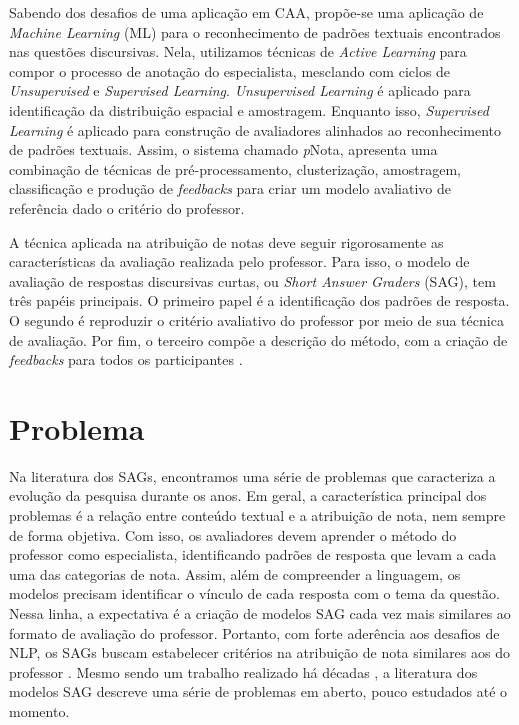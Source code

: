 Sabendo dos desafios de uma aplicação em CAA, propõe-se uma aplicação de \textit{Machine Learning} (ML) para o reconhecimento de padrões textuais encontrados nas questões discursivas. Nela, utilizamos técnicas de \textit{Active Learning} para compor o processo de anotação do especialista, mesclando com ciclos de \textit{Unsupervised} e \textit{Supervised Learning}. \textit{Unsupervised Learning} é aplicado para identificação da distribuição espacial e amostragem. Enquanto isso, \textit{Supervised Learning} é aplicado para construção de avaliadores alinhados ao reconhecimento de padrões textuais. Assim, o sistema chamado \textit{p}Nota, apresenta uma combinação de técnicas de pré-processamento, clusterização, amostragem, classificação e produção de \textit{feedbacks} para criar um modelo avaliativo de referência dado o critério do professor.

A técnica aplicada na atribuição de notas deve seguir rigorosamente as características da avaliação realizada pelo professor. Para isso, o modelo de avaliação de respostas discursivas curtas, ou \textit{Short Answer Graders} (SAG), tem três papéis principais. O primeiro papel é a identificação dos padrões de resposta. O segundo é reproduzir o critério avaliativo do professor por meio de sua técnica de avaliação. Por fim, o terceiro compõe a descrição do método, com a criação de \textit{feedbacks} para todos os participantes \cite{arter2006, spalenza2016a}.


\section{Problema} 
\label{cap1-problema}

Na literatura dos SAGs, encontramos uma série de problemas que caracteriza a evolução da pesquisa durante os anos. Em geral, a característica principal dos problemas é a relação entre conteúdo textual e a atribuição de nota, nem sempre de forma objetiva. Com isso, os avaliadores devem aprender o método do professor como especialista, identificando padrões de resposta que levam a cada uma das categorias de nota. Assim, além de compreender a linguagem, os modelos precisam identificar o vínculo de cada resposta com o tema da questão. Nessa linha, a expectativa é a criação de modelos SAG cada vez mais similares ao formato de avaliação do professor. Portanto, com forte aderência aos desafios de NLP, os SAGs buscam estabelecer critérios na atribuição de nota similares aos do professor \cite{pado2021}. Mesmo sendo um trabalho realizado há décadas \cite{burrows2015}, a literatura dos modelos SAG descreve uma série de problemas em aberto, pouco estudados até o momento.

